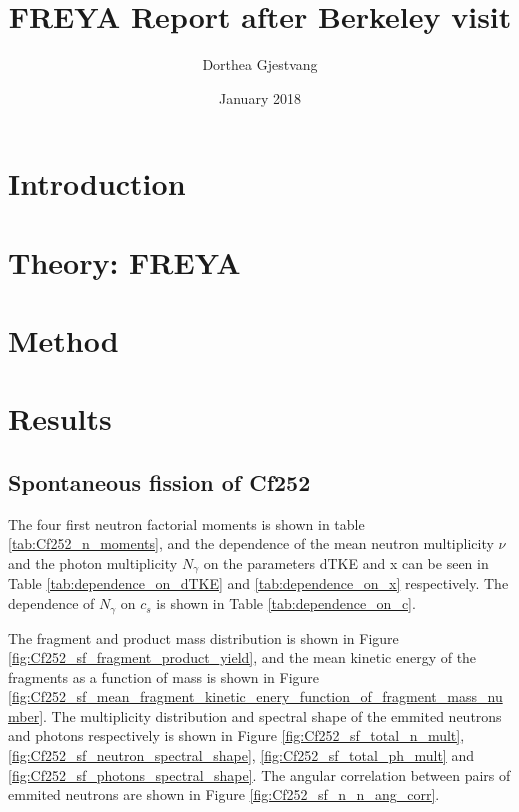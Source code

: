 \documentclass[]{article}
\title{}
\author{}
\begin{document}
	
\title{FREYA Report after Berkeley visit}
\author{Dorthea Gjestvang}
\date{January 2018}

\maketitle

\section{Introduction}

\section{Theory: FREYA}

\section{Method}

\section{Results}

\subsection{Spontaneous fission of Cf252 }

The four first neutron factorial moments is shown in table \ref{tab:Cf252_n_moments}, and the dependence of the mean neutron multiplicity $\nu$ and the photon multiplicity $N_{\gamma}$ on the parameters dTKE and x  can be seen in Table \ref{tab:dependence_on_dTKE} and \ref{tab:dependence_on_x} respectively. The dependence of $N_{\gamma}$ on $c_s$ is shown in Table \ref{tab:dependence_on_c}.

The fragment and product mass distribution is shown in Figure \ref{fig:Cf252_sf_fragment_product_yield}, and the mean kinetic energy of the fragments as a function of mass is shown in Figure \ref{fig:Cf252_sf_mean_fragment_kinetic_enery_function_of_fragment_mass_number}. The multiplicity distribution and spectral shape of the emmited neutrons and photons respectively is shown in Figure \ref{fig:Cf252_sf_total_n_mult}, \ref{fig:Cf252_sf_neutron_spectral_shape}, \ref{fig:Cf252_sf_total_ph_mult} and \ref{fig:Cf252_sf_photons_spectral_shape}. The angular correlation between pairs of emmited neutrons are shown in Figure \ref{fig:Cf252_sf_n_n_ang_corr}.
\end{document}
